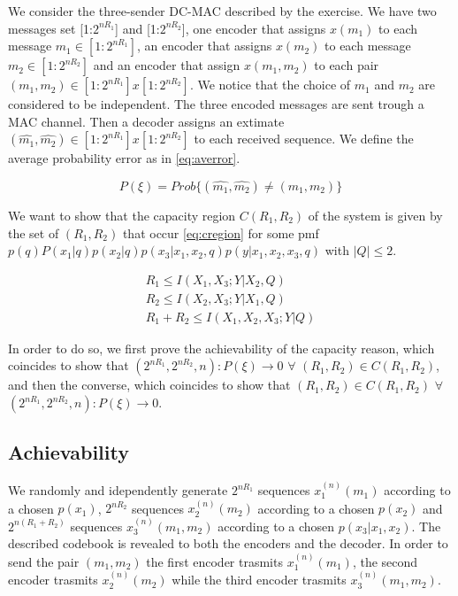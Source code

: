 
We consider the three-sender DC-MAC described by the exercise. We have two messages set [1:$2^{nR_1}$] and [1:$2^{nR_2}$], one encoder that assigns $x(m_1)$ to each message $m_1 \in [1:2^{nR_1}]$, an encoder that assigns $x(m_2)$ to each message $m_2 \in [1:2^{nR_2}]$ and an encoder that assign $x(m_1,m_2)$ to each pair $(m_1,m_2) \in [1:2^{nR_1}]x[1:2^{nR_2}]$. We notice that the choice of $m_1$ and $m_2$ are considered to be independent. The three encoded messages are sent trough a MAC channel. Then a decoder assigns an extimate $(\hat{m_1},\hat{m_2}) \in [1:2^{nR_1}]x[1:2^{nR_2}]$ to each received sequence. We define the average probability error as in \eqref{eq:averror}.

\begin{equation}
	P(\xi)=Prob\{(\hat{m_1},\hat{m_2}) \neq (m_1,m_2)\}
	\label{eq:averror}
\end{equation}

We want to show that the capacity region $C(R_1, R_2)$ of the system is given by the set of $(R_1,R_2)$ that occur \eqref{eq:cregion} for some pmf $p(q)P(x_1|q)p(x_2|q)p(x_3|x_1,x_2,q)p(y|x_1,x_2,x_3,q)$ with $|Q| \leq 2$.

\begin{equation}
	\begin{gathered}
		R_1 \leq I(X_1,X_3;Y|X_2,Q) \\
		R_2 \leq I(X_2,X_3;Y|X_1,Q) \\
		R_1+R_2 \leq I(X_1,X_2,X_3;Y|Q)
	\end{gathered}
	\label{eq:cregion}
\end{equation}

In order to do so, we first prove the achievability of the capacity reason, which coincides to show that $(2^{nR_1},2^{nR_2},n):P(\xi) \rightarrow 0$ $ \forall $ $ (R_1,R_2) \in C(R_1, R_2) $, and then the converse, which coincides to show that $(R_1,R_2) \in C(R_1, R_2) $ $\forall $ $ (2^{nR_1},2^{nR_2},n):P(\xi) \rightarrow 0$.

\subsection{Achievability}

We randomly and idependently generate $2^{nR_1}$ sequences $x_1^{(n)}(m_1)$ according to a chosen $p(x_1)$, $2^{nR_2}$ sequences $x_2^{(n)}(m_2)$ according to a chosen $p(x_2)$ and $2^{n(R_1+R_2)}$ sequences $x_3^{(n)}(m_1,m_2)$ according to a chosen $p(x_3|x_1,x_2)$. The described codebook is revealed to both the encoders and the decoder. In order to send the pair $(m_1,m_2)$ the first encoder trasmits $x_1^{(n)}(m_1)$, the second encoder trasmits $x_2^{(n)}(m_2)$ while the third encoder trasmits $x_3^{(n)}(m_1,m_2)$.

